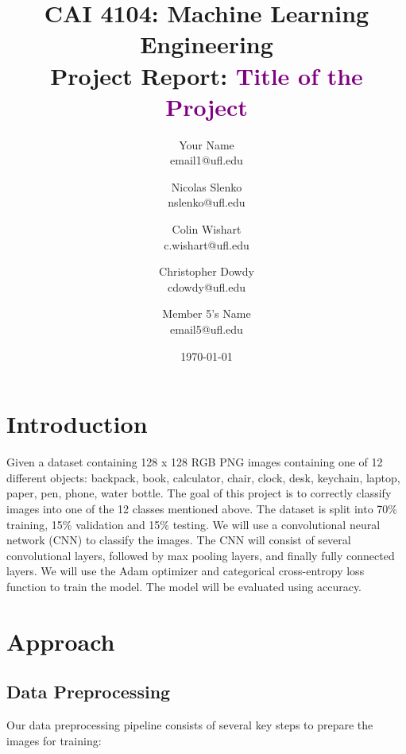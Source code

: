 \documentclass[10pt]{article}
\title{CAI 4104: Machine Learning Engineering\\
	\large Project Report:  {\textcolor{purple}{Title of the Project}}} %
\author{
        Your Name \\
        email1@ufl.edu\\
        \and
        Nicolas Slenko \\
        nslenko@ufl.edu\\
        \and
        Colin Wishart \\
        c.wishart@ufl.edu\\
        \and
        Christopher Dowdy \\
        cdowdy@ufl.edu\\
        \and
        Member 5's Name \\
        email5@ufl.edu\\
}
\date{\today}
\begin{document}

\maketitle






\section{Introduction}

Given a dataset containing 128 x 128 RGB PNG images containing one of 12 different objects: backpack, book, calculator, chair, clock, desk, keychain, laptop, paper, pen, phone, water bottle. The
goal of this project is to correctly classify images into one of the 12 classes mentioned above. The dataset is split into 70\% training, 15\% validation and 15\% testing. We will use a 
convolutional neural network (CNN) to classify the images. The CNN will consist of several convolutional layers, followed by max pooling layers, and finally fully connected layers. 
We will use the Adam optimizer and categorical cross-entropy loss function to train the model. The model will be evaluated using accuracy.





\section{Approach}

\subsection{Data Preprocessing}

Our data preprocessing pipeline consists of several key steps to prepare the images for training:
\end{document}
